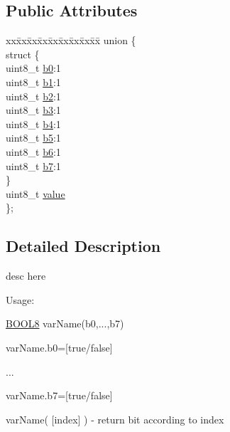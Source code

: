 \subsection*{Public Attributes}
\begin{DoxyCompactItemize}
\item 
\begin{tabbing}
xx\=xx\=xx\=xx\=xx\=xx\=xx\=xx\=xx\=\kill
union \{\\
\>struct \{\\
\>\>uint8\_t \hyperlink{struct_b_o_o_l8_a92d3ed58a5512657583cd9926342c99e}{b0}:1\\
\>\>uint8\_t \hyperlink{struct_b_o_o_l8_a699c85868039c9754d65914930ad30eb}{b1}:1\\
\>\>uint8\_t \hyperlink{struct_b_o_o_l8_a49da127bcc938c52c198397e4288f826}{b2}:1\\
\>\>uint8\_t \hyperlink{struct_b_o_o_l8_a74a24b53dcf41471af36714c18865e71}{b3}:1\\
\>\>uint8\_t \hyperlink{struct_b_o_o_l8_a35fb9d62b5bd70f8bf4c4caf0bc48624}{b4}:1\\
\>\>uint8\_t \hyperlink{struct_b_o_o_l8_a39278ea0628859d4dd54764b6c086d51}{b5}:1\\
\>\>uint8\_t \hyperlink{struct_b_o_o_l8_a8e2e1da9c87724e0ae7df2b5c423e232}{b6}:1\\
\>\>uint8\_t \hyperlink{struct_b_o_o_l8_a64c85814c094ff655b3c9c4a48e9c8be}{b7}:1\\
\>\} \\
\>uint8\_t \hyperlink{struct_b_o_o_l8_a9228545764df2a5470d6d108173f66bf}{value}\\
\}; \\

\end{tabbing}\end{DoxyCompactItemize}


\subsection{Detailed Description}
desc here

Usage\+:

\hyperlink{struct_b_o_o_l8}{B\+O\+O\+L8} var\+Name(b0,...,b7)

var\+Name.\+b0=\mbox{[}true/false\mbox{]}

...

var\+Name.\+b7=\mbox{[}true/false\mbox{]}

var\+Name( \mbox{[}index\mbox{]} ) -\/ return bit according to index

